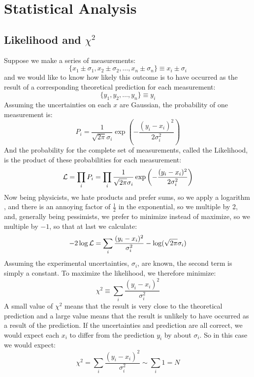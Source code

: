 \documentclass[12pt]{article}
\begin{document}
\newpage


\section{Statistical Analysis}

\subsection{Likelihood and $\chi^2$}

Suppose we make a series of measurements:
\begin{displaymath}
\{x_1 \pm \sigma_1, x_2 \pm \sigma_2, \ldots, x_n \pm \sigma_n \} \equiv x_i \pm \sigma_i
\end{displaymath}
and we would like to know how likely this outcome is to have occurred as the result of a corresponding theoretical prediction for each measurement:
\begin{displaymath}
\{y_1, y_2, \ldots, y_n \} \equiv y_i
\end{displaymath}
Assuming the uncertainties on each $x$ are Gaussian, the probability of one measurement is:
\begin{displaymath}
P_i = \frac{1}{\sqrt{2 \pi} \sigma_i}  \exp\left( - \frac{(y_i-x_i)^2}{2\sigma_i^2}\right)
\end{displaymath}
And the probability for the complete set of measurements, called the Likelihood, is the product of these probabilities for each measurement:
\begin{displaymath}
{\cal L} = \prod_i P_i = \prod_i \frac{1}{\sqrt{2 \pi} \sigma_i}  \exp\left( - \frac{(y_i-x_i)^2}{2\sigma_i^2}\right)
\end{displaymath}
Now being physicists, we hate products and prefer sums, so we apply a logarithm , and there is an annoying factor of $\frac{1}{2}$ in the exponential, so we multiple by 2, and, generally being pessimists, we prefer to minimize instead of maximize, so we multiple by $-1$, so that at last 
we calculate:
\begin{equation}
-2 \log {\cal L} = \sum_i \frac{(y_i-x_i)^2}{\sigma_i^2} - \log(\sqrt{2\pi}\sigma_i)
\end{equation}
Assuming the experimental uncertainties, $\sigma_i$, are known, the second term is simply a constant.  To maximize the likelihood, we therefore 
minimize:
\begin{equation}
\chi^2 \equiv \sum_i \frac{(y_i-x_i)^2}{\sigma_i^2} 
\end{equation}
A small value of $\chi^2$ means that the result is very close to the theoretical prediction and a large value means that the result is unlikely to have occurred as a result of the prediction.  If the uncertainties and prediction are all correct, we would expect each $x_i$ to differ from the prediction $y_i$ by about $\sigma_i$.  So in this case we would expect:
\begin{equation}
\chi^2 = \sum_i \frac{(y_i-x_i)^2}{\sigma_i^2} \sim \sum_i 1 = N
\end{equation}
\end{document}
